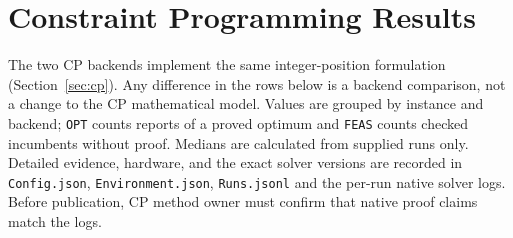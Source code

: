 \section{Constraint Programming Results}\label{sec:cp-results}

The two CP backends implement the same integer-position formulation (Section~\ref{sec:cp}).
Any difference in the rows below is a backend comparison, not a change to the
CP mathematical model. Values are grouped by instance and backend;
\texttt{OPT} counts reports of a proved optimum and \texttt{FEAS} counts checked
incumbents without proof. Medians are calculated from supplied runs only.
Detailed evidence, hardware, and the exact solver versions are recorded in
\texttt{Config.json}, \texttt{Environment.json}, \texttt{Runs.jsonl} and the
per-run native solver logs. Before publication, CP method owner must confirm
that native proof claims match the logs.

